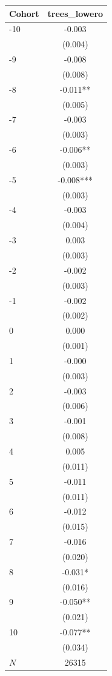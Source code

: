 {
\def\sym#1{\ifmmode^{#1}\else\(^{#1}\)\fi}
\begin{tabular}{l*{1}{c}}
\toprule
Cohort    &trees\_lowero   \\
\midrule
-10       &   -0.003   \\
          &  (0.004)   \\
-9        &   -0.008   \\
          &  (0.008)   \\
-8        &   -0.011** \\
          &  (0.005)   \\
-7        &   -0.003   \\
          &  (0.003)   \\
-6        &   -0.006** \\
          &  (0.003)   \\
-5        &   -0.008***\\
          &  (0.003)   \\
-4        &   -0.003   \\
          &  (0.004)   \\
-3        &    0.003   \\
          &  (0.003)   \\
-2        &   -0.002   \\
          &  (0.003)   \\
-1        &   -0.002   \\
          &  (0.002)   \\
0         &    0.000   \\
          &  (0.001)   \\
1         &   -0.000   \\
          &  (0.003)   \\
2         &   -0.003   \\
          &  (0.006)   \\
3         &   -0.001   \\
          &  (0.008)   \\
4         &    0.005   \\
          &  (0.011)   \\
5         &   -0.011   \\
          &  (0.011)   \\
6         &   -0.012   \\
          &  (0.015)   \\
7         &   -0.016   \\
          &  (0.020)   \\
8         &   -0.031*  \\
          &  (0.016)   \\
9         &   -0.050** \\
          &  (0.021)   \\
10        &   -0.077** \\
          &  (0.034)   \\
\midrule
\(N\)     &    26315   \\
\bottomrule
\end{tabular}
}
